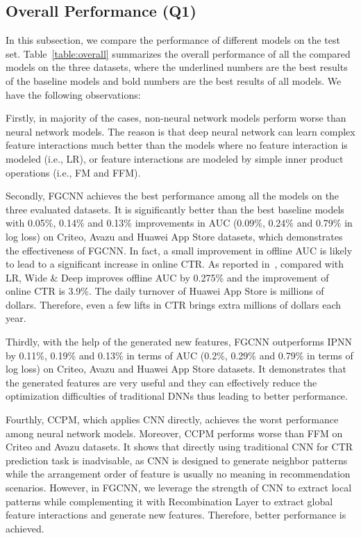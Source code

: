 \subsection{Overall Performance (Q1)}

In this subsection, we compare the performance of different models on the test set. Table~\ref{table:overall} summarizes the overall performance of all the compared models on the three datasets, where the underlined numbers are the best results of the baseline models and bold numbers are the best results of all models.
We have the following observations:

Firstly, in majority of the cases, non-neural network models perform worse than neural network models. The reason is that deep neural network can learn complex feature interactions much better than the models where no feature interaction is modeled (i.e., LR), or feature interactions are modeled by simple inner product operations (i.e., FM and FFM).

Secondly,  FGCNN achieves the best performance among all the models on the three evaluated datasets. It is significantly better than the best baseline models with 0.05\%, 0.14\% and 0.13\% improvements in AUC (0.09\%, 0.24\% and 0.79\% in log loss) on Criteo, Avazu and Huawei App Store datasets, which demonstrates the effectiveness of FGCNN.  In fact, a small improvement in offline AUC is likely to lead to a significant increase in online CTR. As reported in~\cite{cheng2016wide}, compared with LR, Wide \& Deep improves offline AUC by 0.275\% and the improvement of online CTR is 3.9\%. The daily turnover of Huawei App Store is millions of dollars. Therefore, even a few lifts in CTR brings extra millions of dollars each year. 

Thirdly, with the help of the generated new features, FGCNN outperforms IPNN by 0.11\%, 0.19\% and 0.13\% in terms of AUC (0.2\%, 0.29\% and 0.79\% in terms of log loss) on Criteo, Avazu and Huawei App Store datasets. It demonstrates that the generated features are very useful and  they can effectively reduce the optimization difficulties of traditional DNNs thus leading to better performance.

Fourthly, CCPM, which applies CNN directly, achieves the worst performance among neural network models.  Moreover, CCPM performs worse than FFM on Criteo and Avazu datasets. It shows that directly using traditional CNN for CTR prediction task is inadvisable, as CNN is designed to generate neighbor patterns while the arrangement order of feature is usually no meaning in recommendation scenarios. However, in FGCNN, we leverage the strength of CNN to extract local patterns while complementing it with Recombination Layer to extract global feature interactions and generate new features. Therefore, better performance is achieved.
